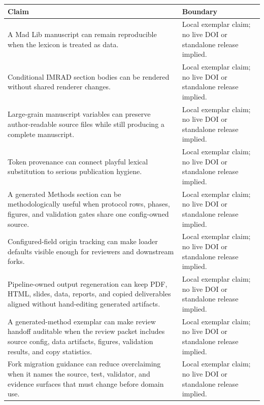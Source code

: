 \documentclass[
  english,
]{article}
\newcounter{none} %
\begin{document}
{\def\LTcaptype{none} %
\begin{longtable}[]{@{}
  >{\raggedright\arraybackslash}p{}
  >{\raggedright\arraybackslash}p{}@{}}
\toprule\noalign{}
\begin{minipage}[b]{\linewidth}\raggedright
Claim
\end{minipage} & \begin{minipage}[b]{\linewidth}\raggedright
Boundary
\end{minipage} \\
\midrule\noalign{}
\endhead
\bottomrule\noalign{}
\endlastfoot
A Mad Lib manuscript can remain reproducible when the lexicon is treated
as data. & Local exemplar claim; no live DOI or standalone release
implied. \\
Conditional IMRAD section bodies can be rendered without shared renderer
changes. & Local exemplar claim; no live DOI or standalone release
implied. \\
Large-grain manuscript variables can preserve author-readable source
files while still producing a complete manuscript. & Local exemplar
claim; no live DOI or standalone release implied. \\
Token provenance can connect playful lexical substitution to serious
publication hygiene. & Local exemplar claim; no live DOI or standalone
release implied. \\
A generated Methods section can be methodologically useful when protocol
rows, phases, figures, and validation gates share one config-owned
source. & Local exemplar claim; no live DOI or standalone release
implied. \\
Configured-field origin tracking can make loader defaults visible enough
for reviewers and downstream forks. & Local exemplar claim; no live DOI
or standalone release implied. \\
Pipeline-owned output regeneration can keep PDF, HTML, slides, data,
reports, and copied deliverables aligned without hand-editing generated
artifacts. & Local exemplar claim; no live DOI or standalone release
implied. \\
A generated-method exemplar can make review handoff auditable when the
review packet includes source config, data artifacts, figures,
validation results, and copy statistics. & Local exemplar claim; no live
DOI or standalone release implied. \\
Fork migration guidance can reduce overclaiming when it names the
source, test, validator, and evidence surfaces that must change before
domain use. & Local exemplar claim; no live DOI or standalone release
implied. \\
\end{longtable}
}
\end{document}
